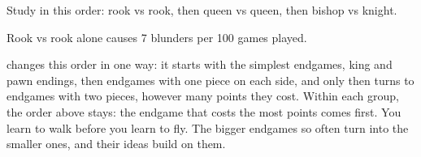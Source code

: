 \begin{keypoints}
\item Study in this order: rook vs rook, then queen vs queen, then bishop vs knight.
\item Rook vs rook alone causes 7 blunders per 100 games played.
\item {} changes this order in one way: it starts with the simplest endgames, king and pawn endings, then endgames with one piece on each side, and only then turns to endgames with two pieces, however many points they cost. Within each group, the order above stays: the endgame that costs the most points comes first. You learn to walk before you learn to fly. The bigger endgames so often turn into the smaller ones, and their ideas build on them.
\end{keypoints}
